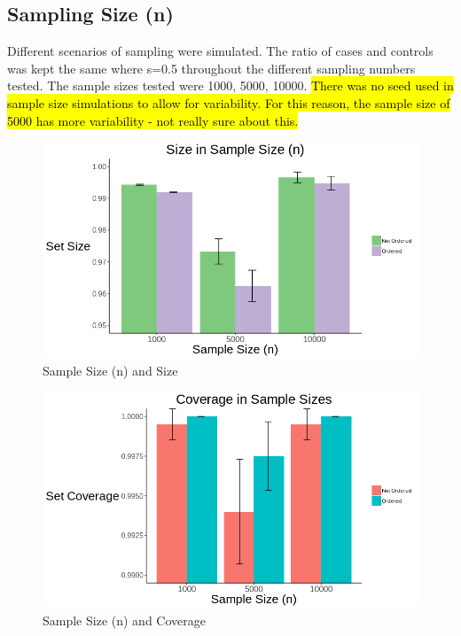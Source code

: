 \subsection{Sampling Size (n)}


Different scenarios of sampling were simulated. The ratio of cases and controls was kept the same where s=0.5 throughout the different sampling numbers tested. The sample sizes tested were 1000, 5000, 10000.  \hl{There was no seed used in sample size simulations to allow for variability. For this reason, the sample size of 5000 has more variability - not really sure about this.}

\begin{figure}[H]
\centering
\includegraphics[scale=0.625]{images/Barplots/N_Size.png}
\caption{Sample Size (n) and Size}
\label{fig: Ordered_Size}
\end{figure}



\begin{figure}[H]
\centering
\includegraphics[scale=0.625]{images/Barplots/N_Cov.png}
\caption{Sample Size (n) and Coverage}
\label{fig: N_Cov}
\end{figure}


